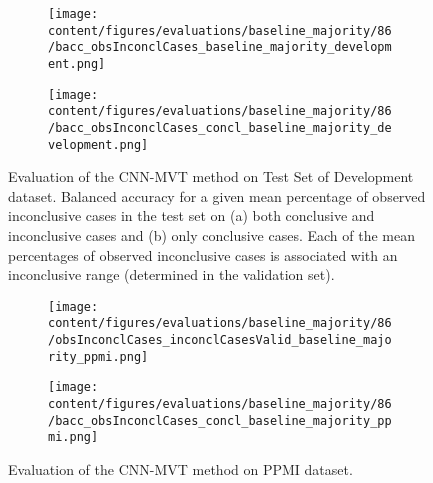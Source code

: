 \begin{figure}[t]
  \begin{subfigure}{0.9\textwidth}
    \centering
    \texttt{[image: content/figures/evaluations/baseline\_majority/86/bacc\_obsInconclCases\_baseline\_majority\_development.png]}
    \subcaption{}
    \label{fig:bacc_obsInconclCases_baseline_majority_development}
  \end{subfigure}
  \hfill
  \begin{subfigure}{0.9\textwidth}
    \centering
    \texttt{[image: content/figures/evaluations/baseline\_majority/86/bacc\_obsInconclCases\_concl\_baseline\_majority\_development.png]}
    \subcaption{}
    \label{fig:bacc_obsInconclCases_concl_baseline_majority_development}
  \end{subfigure}

  \caption{Evaluation of the CNN-MVT method on Test Set of Development dataset.
  Balanced accuracy for a given mean percentage of observed inconclusive cases in the test set on 
  (a) both conclusive and inconclusive cases and (b) only conclusive cases. 
  Each of the mean percentages of observed inconclusive cases is associated with an inconclusive range (determined in the validation set). }
  \label{fig:bacc_obsInconclCases_baseline_majority_development_full}
\end{figure}




\begin{figure}[t]
  \begin{subfigure}{0.9\textwidth}
    \centering
    \texttt{[image: content/figures/evaluations/baseline\_majority/86/obsInconclCases\_inconclCasesValid\_baseline\_majority\_ppmi.png]}
    \label{fig:obsInconclCases_inconclCasesValid_baseline_majority_ppmi}
  \end{subfigure}
  \hfill
  \begin{subfigure}{0.9\textwidth}
    \centering
    \texttt{[image: content/figures/evaluations/baseline\_majority/86/bacc\_obsInconclCases\_concl\_baseline\_majority\_ppmi.png]}
    \label{fig:bacc_obsInconclCases_concl_baseline_majority_ppmi}
  \end{subfigure}
  \caption{Evaluation of the CNN-MVT method on PPMI dataset.}
\end{figure}



